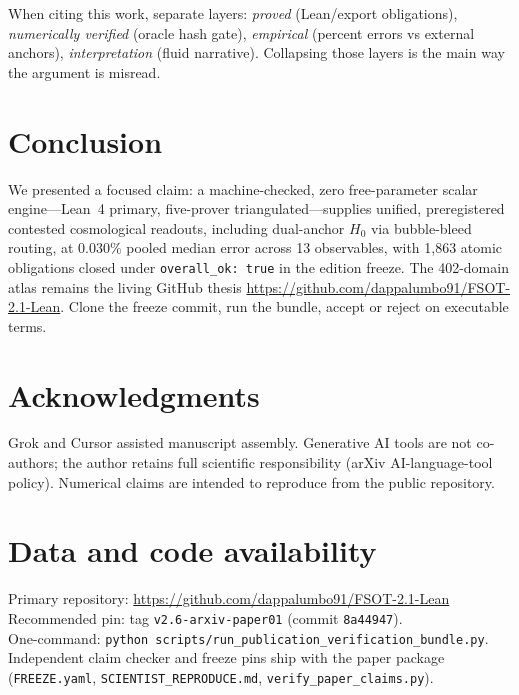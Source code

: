 \documentclass[11pt,a4paper]{article}
\begin{document}
When citing this work, separate layers:
\emph{proved} (Lean/export obligations),
\emph{numerically verified} (oracle hash gate),
\emph{empirical} (percent errors vs external anchors),
\emph{interpretation} (fluid narrative).
Collapsing those layers is the main way the argument is misread.

\section{Conclusion}
\label{sec:conc}

We presented a focused claim: a machine-checked, zero free-parameter scalar
engine---Lean~4 primary, five-prover triangulated---supplies unified,
preregistered contested cosmological readouts, including dual-anchor $H_0$ via
bubble-bleed routing, at $0.030\%$ pooled median error across 13 observables,
with 1{,}863 atomic obligations closed under \texttt{overall\_ok: true} in the
edition freeze.
The 402-domain atlas remains the living GitHub thesis
\url{https://github.com/dappalumbo91/FSOT-2.1-Lean}.
Clone the freeze commit, run the bundle, accept or reject on executable terms.

\section*{Acknowledgments}
Grok and Cursor assisted manuscript assembly.
Generative AI tools are not co-authors; the author retains full scientific
responsibility (arXiv AI-language-tool policy).
Numerical claims are intended to reproduce from the public repository.

\section*{Data and code availability}
Primary repository: \url{https://github.com/dappalumbo91/FSOT-2.1-Lean}\\
Recommended pin: tag \texttt{v2.6-arxiv-paper01} (commit \texttt{8a44947}).\\
One-command:
\texttt{python scripts/run\_publication\_verification\_bundle.py}.\\
Independent claim checker and freeze pins ship with the paper package
(\texttt{FREEZE.yaml}, \texttt{SCIENTIST\_REPRODUCE.md},
\texttt{verify\_paper\_claims.py}).



\end{document}
